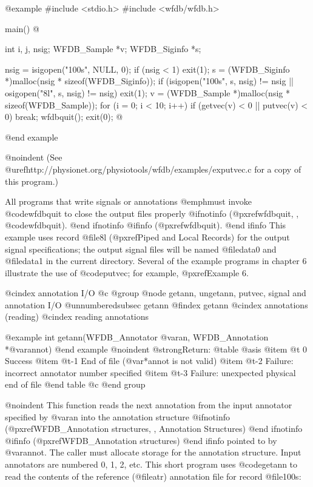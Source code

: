 {{{{{{{{@example
#include <stdio.h>
#include <wfdb/wfdb.h>

main()
@{
    int i, j, nsig;
    WFDB_Sample *v;
    WFDB_Siginfo *s;

    nsig = isigopen("100s", NULL, 0);
    if (nsig < 1)
        exit(1);
    s = (WFDB_Siginfo *)malloc(nsig * sizeof(WFDB_Siginfo));
    if (isigopen("100s", s, nsig) != nsig || 
        osigopen("8l", s, nsig) != nsig)
        exit(1);
    v = (WFDB_Sample *)malloc(nsig * sizeof(WFDB_Sample));
    for (i = 0; i < 10; i++)
        if (getvec(v) < 0 || putvec(v) < 0)
            break;
    wfdbquit();
    exit(0);
@}
@end example

@noindent
(See @uref{http://physionet.org/physiotools/wfdb/examples/exputvec.c}
for a copy of this program.)

All programs that write signals or annotations @emph{must} invoke
@code{wfdbquit} to close the output files properly
@ifnotinfo
(@pxref{wfdbquit, , @code{wfdbquit}}).
@end ifnotinfo
@ifinfo
(@pxref{wfdbquit}).
@end ifinfo
This example uses record @file{8l} (@pxref{Piped and Local Records}) for the
output signal specifications; the output signal files will be named
@file{data0} and @file{data1} in the current directory.  Several of the example
programs in chapter 6 illustrate the use of @code{putvec}; for example,
@pxref{Example 6}.

@cindex annotation I/O
@c @group
@node     getann, ungetann, putvec, signal and annotation I/O
@unnumberedsubsec getann
@findex getann
@cindex annotations (reading)
@cindex reading annotations

@example
int getann(WFDB_Annotator @var{an}, WFDB_Annotation *@var{annot})
@end example
@noindent
@strong{Return:}
@table @asis
@item @t{ 0}
Success
@item @t{-1}
End of file (@var{*annot} is not valid)
@item @t{-2}
Failure: incorrect annotator number specified
@item @t{-3}
Failure: unexpected physical end of file
@end table
@c @end group

@noindent
This function reads the next annotation from the input annotator
specified by @var{an} into the annotation structure
@ifnotinfo
(@pxref{WFDB_Annotation structures, , Annotation Structures})
@end ifnotinfo
@ifinfo
(@pxref{WFDB_Annotation structures})
@end ifinfo
pointed to by @var{annot}.  The caller must allocate storage for the
annotation structure.  Input annotators are numbered 0, 1, 2, etc.  This
short program uses @code{getann} to read the contents of the reference
(@file{atr}) annotation file for record @file{100s}:

}}}}}}}}

